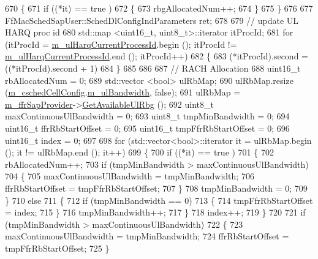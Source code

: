 \begin{DoxyCode}
670     \{
671       \textcolor{keywordflow}{if} ((*it) == true )
672         \{
673           rbgAllocatedNum++;
674         \}
675     \}
676 
677   FfMacSchedSapUser::SchedDlConfigIndParameters ret;
678 
679   \textcolor{comment}{//   update UL HARQ proc id}
680   std::map <uint16\_t, uint8\_t>::iterator itProcId;
681   \textcolor{keywordflow}{for} (itProcId = \hyperlink{classns3_1_1PfFfMacScheduler_aff9dac165a5c80c99f237adf365321d6}{m\_ulHarqCurrentProcessId}.begin (); itProcId != 
      \hyperlink{classns3_1_1PfFfMacScheduler_aff9dac165a5c80c99f237adf365321d6}{m\_ulHarqCurrentProcessId}.end (); itProcId++)
682     \{
683       (*itProcId).second = ((*itProcId).second + 1) %
684     \}
685 
686 
687   \textcolor{comment}{// RACH Allocation}
688   uint16\_t rbAllocatedNum = 0;
689   std::vector <bool> ulRbMap;
690   ulRbMap.resize (\hyperlink{classns3_1_1PfFfMacScheduler_a0be1f7a1e78824b031e48208b8af1048}{m\_cschedCellConfig}.\hyperlink{structns3_1_1FfMacCschedSapProvider_1_1CschedCellConfigReqParameters_a5ab5b102878e6e7e7727a14af4a64d2f}{m\_ulBandwidth}, \textcolor{keyword}{false});
691   ulRbMap = \hyperlink{classns3_1_1PfFfMacScheduler_a40519746bd3f39a4b664db3036f2e3fd}{m\_ffrSapProvider}->\hyperlink{classns3_1_1LteFfrSapProvider_aafd23b22a27ec83e03d54795c122d175}{GetAvailableUlRbg} ();
692   uint8\_t maxContinuousUlBandwidth = 0;
693   uint8\_t tmpMinBandwidth = 0;
694   uint16\_t ffrRbStartOffset = 0;
695   uint16\_t tmpFfrRbStartOffset = 0;
696   uint16\_t index = 0;
697 
698   \textcolor{keywordflow}{for} (std::vector<bool>::iterator it = ulRbMap.begin (); it != ulRbMap.end (); it++)
699     \{
700       \textcolor{keywordflow}{if} ((*it) == true )
701         \{
702           rbAllocatedNum++;
703           \textcolor{keywordflow}{if} (tmpMinBandwidth > maxContinuousUlBandwidth)
704             \{
705               maxContinuousUlBandwidth = tmpMinBandwidth;
706               ffrRbStartOffset = tmpFfrRbStartOffset;
707             \}
708           tmpMinBandwidth = 0;
709         \}
710       \textcolor{keywordflow}{else}
711         \{
712           \textcolor{keywordflow}{if} (tmpMinBandwidth == 0)
713             \{
714               tmpFfrRbStartOffset = index;
715             \}
716           tmpMinBandwidth++;
717         \}
718       index++;
719     \}
720 
721   \textcolor{keywordflow}{if} (tmpMinBandwidth > maxContinuousUlBandwidth)
722     \{
723       maxContinuousUlBandwidth = tmpMinBandwidth;
724       ffrRbStartOffset = tmpFfrRbStartOffset;
725     \}

\end{DoxyCode}
